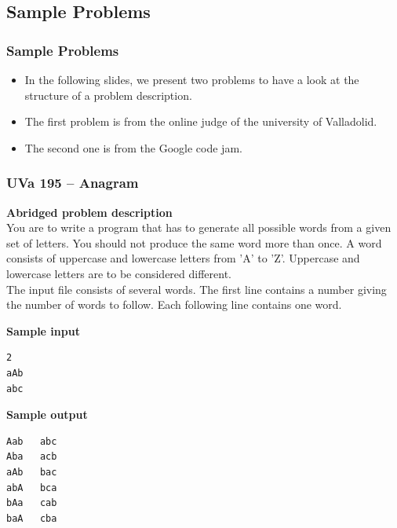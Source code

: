 \documentclass{beamer}
\begin{document}
\subsection{Sample Problems}

\begin{frame}%
\frametitle{Sample Problems}

\begin{itemize}

\item In the following slides, we present two problems to have a look at the structure of a problem
description.

\vspace{0.3cm}

\item The first problem is from the online judge of the university of Valladolid.

\vspace{0.3cm}

\item The second one is from the Google code jam.

\end{itemize}

\end{frame}

\begin{frame}[fragile]
\frametitle{UVa 195 -- Anagram}


\scriptsize

\textbf{Abridged problem description}\\
\vspace{0.1cm}
You are to write a program that has to generate all possible words from a given set of letters. You
should not produce the same word more than once. A word consists of uppercase and lowercase letters from 'A' to 'Z'. Uppercase
and lowercase letters are to be considered different.\\
The input file consists of several words. The first line contains a number giving the number of words to follow. Each following line contains one word.
\vspace{0.2cm}


\textbf{Sample input}
\begin{verbatim}
2
aAb
abc
\end{verbatim}


\textbf{Sample output}
\begin{verbatim}
Aab   abc
Aba   acb
aAb   bac
abA   bca
bAa   cab
baA   cba
\end{verbatim}

\end{frame}
\end{document}
